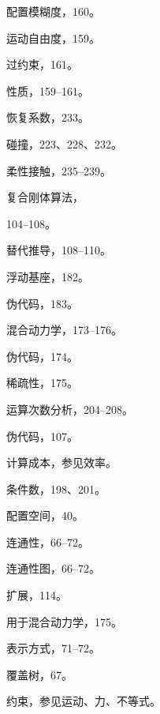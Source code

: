 \documentclass[10pt,a4paper]{book}
\theoremstyle{thmstyle} %
\theoremstyle{defstyle} %
\theoremstyle{prostyle} %
\begin{document}
配置模糊度，160。



运动自由度，159。



过约束，161。



性质，159–161。



恢复系数，233。



碰撞，223、228、232。



柔性接触，235–239。



复合刚体算法，



104–108。



替代推导，108–110。



浮动基座，182。



伪代码，183。



混合动力学，173–176。



伪代码，174。



稀疏性，175。



运算次数分析，204–208。



伪代码，107。



计算成本，参见效率。



条件数，198、201。



配置空间，40。



连通性，66–72。



连通性图，66–72。



扩展，114。



用于混合动力学，175。



表示方式，71–72。



覆盖树，67。



约束，参见运动、力、不等式。
\end{document}
